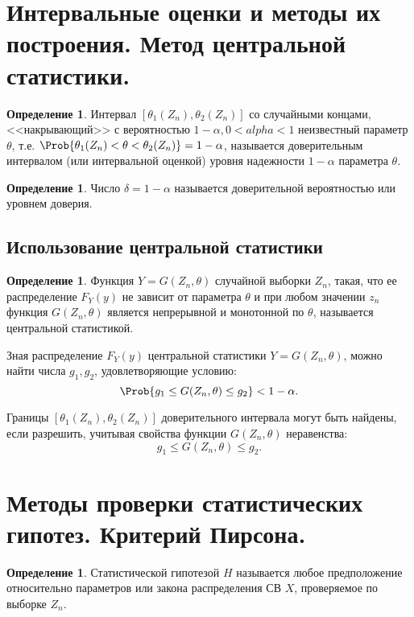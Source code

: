 \documentclass[12pt]{report}
\theoremstyle{definition}
\newtheorem{definition}[theorem]{Определение}
\begin{document}
\section
{
  Интервальные оценки и методы их построения.
  Метод центральной статистики.
}

\begin{definition}
Интервал $[\theta_1(Z_n), \theta_2(Z_n)]$ со случайными концами, <<накрывающий>>
с вероятностью $1 - \alpha, 0 < alpha < 1$ неизвестный параметр $\theta$, т.е.
$\Prob\{\theta_1(Z_n) < \theta < \theta_2(Z_n)\} = 1 - \alpha$,
называется доверительным интервалом (или интервальной оценкой)
уровня надежности $1 - \alpha$ параметра $\theta$.
\end{definition}


\begin{definition}
Число $\delta = 1 - \alpha$ называется доверительной вероятностью
или уровнем доверия.
\end{definition}

\subsection{Использование центральной статистики}
\begin{definition}
Функция $Y= G(Z_n, \theta)$ случайной выборки $Z_n$, такая, что ее
распределение $F_Y(y)$ не зависит от параметра $\theta$ и при любом
значении $z_n$ функция $G(Z_n, \theta)$ является непрерывной и монотонной
по $\theta$, называется центральной статистикой.
\end{definition}

Зная распределение $F_Y(y)$ центральной статистики $Y= G(Z_n, \theta)$,
можно найти числа $g_1, g_2$, удовлетворяющие условию:
$$
\Prob\{ g_1 \le G(Z_n, \theta) \le g_2 \} < 1 - \alpha.
$$

Границы $[\theta_1(Z_n), \theta_2(Z_n)]$ доверительного интервала
могут быть найдены, если разрешить, учитывая свойства функции
$G(Z_n, \theta)$ неравенства:
$$
g_1 \le G(Z_n, \theta) \le g_2.
$$


\section{Методы проверки статистических гипотез. Критерий Пирсона.}

\begin{definition}
Статистической гипотезой $H$ называется любое предположение
относительно параметров или закона распределения СВ $X$,
проверяемое по выборке $Z_n$.
\end{definition}
\end{document}
